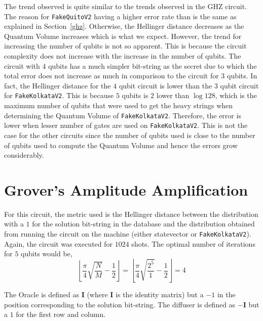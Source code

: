\documentclass[11pt]{article}
\begin{document}
The trend observed is quite similar to the trends observed in the GHZ circuit. The reason for \texttt{FakeQuitoV2} having a higher error rate than is the same as explained in Section~\ref{ghz}. Otherwise, the Hellinger distance decreases as the Quantum Volume increases which is what we expect. However, the trend for increasing the number of qubits is not so apparent. This is because the circuit complexity does not increase with the increase in the number of qubits. The circuit with $4$ qubits has a much simpler bit-string as the secret due to which the total error does not increase as much in comparison to the circuit for $3$ qubits. In fact, the Hellinger distance for the $4$ qubit circuit is lower than the $3$ qubit circuit for \texttt{FakeKolkataV2}. This is because $5$ qubits is $2$ lower than $\log 128$, which is the maximum number of qubits that were used to get the heavy strings when determining the Quantum Volume of \texttt{FakeKolkataV2}. Therefore, the error is lower when lesser number of gates are used on \texttt{FakeKolkataV2}. This is not the case for the other circuits since the number of qubits used is close to the number of qubits used to compute the Quantum Volume and hence the errors grow considerably.


\section{Grover's Amplitude Amplification}
For this circuit, the metric used is the Hellinger distance between the distribution with a $1$ for the solution bit-string in the database and the distribution obtained from running the circuit on the machine (either statevector or \texttt{FakeKolkataV2}). Again, the circuit was executed for $1024$ shots. The optimal number of iterations for $5$ qubits would be,
\begin{equation}
        \left\lfloor \frac{\pi}{4}\sqrt{\frac{N}{M}} - \frac{1}{2} \right\rfloor = \left\lfloor \frac{\pi}{4}\sqrt{\frac{2^5}{1}} - \frac{1}{2} \right\rfloor = 4
\end{equation}

The Oracle is defined as $\mathbf{I}$ (where $\mathbf{I}$ is the identity matrix) but a $-1$ in the position corresponding to the solution bit-string. The diffuser is defined as $-\mathbf{I}$ but a $1$ for the first row and column.
\end{document}
